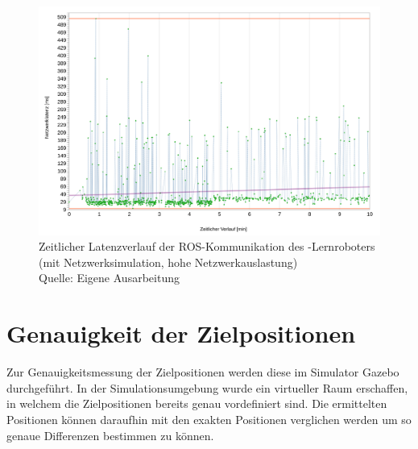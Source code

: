 \begin{figure}[htb]
	\centering
	\includegraphics[width=1.04\textwidth]{images/ergebnisse/ROS_App_mit_Netzwerksimulation_und_hohe_Auslastung}
	\caption[Zeitlicher Latenzverlauf der ROS-Kommunikation des -Lernroboters (mit Netzwerksimulation, hohe Netzwerkauslastung)]{Zeitlicher Latenzverlauf der ROS-Kommunikation des -Lernroboters (mit Netzwerksimulation, hohe Netzwerkauslastung)\\Quelle: Eigene Ausarbeitung}
	\label{fig:measurement_robot_ros_with_network_simulation_high_network_traffic}
\end{figure}
\FloatBarrier





\section{Genauigkeit der Zielpositionen}
Zur Genauigkeitsmessung der Zielpositionen werden diese im Simulator Gazebo durchgeführt. In der Simulationsumgebung wurde ein virtueller Raum erschaffen, in welchem die Zielpositionen bereits genau vordefiniert sind. Die ermittelten Positionen können daraufhin mit den exakten Positionen verglichen werden um so genaue Differenzen bestimmen zu können.

